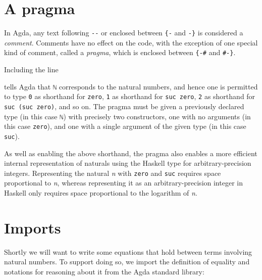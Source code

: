 \hypertarget{a-pragma}{%
\section{A pragma}\label{a-pragma}}

In Agda, any text following \texttt{-\/-} or enclosed between
\texttt{\{-} and \texttt{-\}} is considered a \emph{comment}. Comments
have no effect on the code, with the exception of one special kind of
comment, called a \emph{pragma}, which is enclosed between
\texttt{\{-\#} and \texttt{\#-\}}.

Including the line

\begin{fence}
\begin{code}%
\>[0]\AgdaSymbol{\{-\#}\AgdaSpace{}%
\AgdaSpace{}%
\AgdaSpace{}%
\AgdaSpace{}%
\AgdaSymbol{\#-\}}\<%
\end{code}
\end{fence}

tells Agda that \texttt{ℕ} corresponds to the natural numbers, and hence
one is permitted to type \texttt{0} as shorthand for \texttt{zero},
\texttt{1} as shorthand for \texttt{suc\ zero}, \texttt{2} as shorthand
for \texttt{suc\ (suc\ zero)}, and so on. The pragma must be given a
previously declared type (in this case \texttt{ℕ}) with precisely two
constructors, one with no arguments (in this case \texttt{zero}), and
one with a single argument of the given type (in this case
\texttt{suc}).

As well as enabling the above shorthand, the pragma also enables a more
efficient internal representation of naturals using the Haskell type for
arbitrary-precision integers. Representing the natural \emph{n} with
\texttt{zero} and \texttt{suc} requires space proportional to \emph{n},
whereas representing it as an arbitrary-precision integer in Haskell
only requires space proportional to the logarithm of \emph{n}.

\hypertarget{imports}{%
\section{Imports}\label{imports}}

Shortly we will want to write some equations that hold between terms
involving natural numbers. To support doing so, we import the definition
of equality and notations for reasoning about it from the Agda standard
library:

